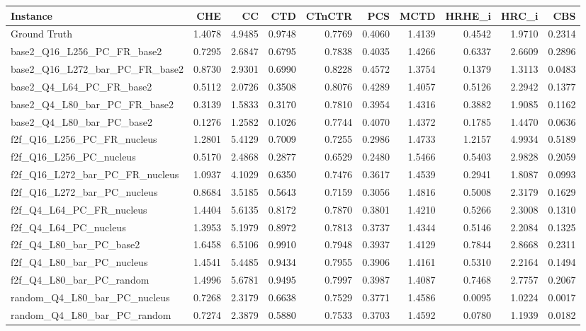\begin{tabular}{lrrrrrrrrr}
\toprule
Instance & CHE & CC & CTD & CTnCTR & PCS & MCTD & HRHE_i & HRC_i & CBS \\
\midrule
Ground Truth & 1.4078 & 4.9485 & 0.9748 & 0.7769 & 0.4060 & 1.4139 & 0.4542 & 1.9710 & 0.2314 \\
base2_Q16_L256_PC_FR_base2 & 0.7295 & 2.6847 & 0.6795 & 0.7838 & 0.4035 & 1.4266 & 0.6337 & 2.6609 & 0.2896 \\
base2_Q16_L272_bar_PC_FR_base2 & 0.8730 & 2.9301 & 0.6990 & 0.8228 & 0.4572 & 1.3754 & 0.1379 & 1.3113 & 0.0483 \\
base2_Q4_L64_PC_FR_base2 & 0.5112 & 2.0726 & 0.3508 & 0.8076 & 0.4289 & 1.4057 & 0.5126 & 2.2942 & 0.1377 \\
base2_Q4_L80_bar_PC_FR_base2 & 0.3139 & 1.5833 & 0.3170 & 0.7810 & 0.3954 & 1.4316 & 0.3882 & 1.9085 & 0.1162 \\
base2_Q4_L80_bar_PC_base2 & 0.1276 & 1.2582 & 0.1026 & 0.7744 & 0.4070 & 1.4372 & 0.1785 & 1.4470 & 0.0636 \\
f2f_Q16_L256_PC_FR_nucleus & 1.2801 & 5.4129 & 0.7009 & 0.7255 & 0.2986 & 1.4733 & 1.2157 & 4.9934 & 0.5189 \\
f2f_Q16_L256_PC_nucleus & 0.5170 & 2.4868 & 0.2877 & 0.6529 & 0.2480 & 1.5466 & 0.5403 & 2.9828 & 0.2059 \\
f2f_Q16_L272_bar_PC_FR_nucleus & 1.0937 & 4.1029 & 0.6350 & 0.7476 & 0.3617 & 1.4539 & 0.2941 & 1.8087 & 0.0993 \\
f2f_Q16_L272_bar_PC_nucleus & 0.8684 & 3.5185 & 0.5643 & 0.7159 & 0.3056 & 1.4816 & 0.5008 & 2.3179 & 0.1629 \\
f2f_Q4_L64_PC_FR_nucleus & 1.4404 & 5.6135 & 0.8172 & 0.7870 & 0.3801 & 1.4210 & 0.5266 & 2.3008 & 0.1310 \\
f2f_Q4_L64_PC_nucleus & 1.3953 & 5.1979 & 0.8972 & 0.7813 & 0.3737 & 1.4344 & 0.5146 & 2.2084 & 0.1325 \\
f2f_Q4_L80_bar_PC_base2 & 1.6458 & 6.5106 & 0.9910 & 0.7948 & 0.3937 & 1.4129 & 0.7844 & 2.8668 & 0.2311 \\
f2f_Q4_L80_bar_PC_nucleus & 1.4541 & 5.4485 & 0.9434 & 0.7955 & 0.3906 & 1.4161 & 0.5310 & 2.2164 & 0.1494 \\
f2f_Q4_L80_bar_PC_random & 1.4996 & 5.6781 & 0.9495 & 0.7997 & 0.3987 & 1.4087 & 0.7468 & 2.7757 & 0.2067 \\
random_Q4_L80_bar_PC_nucleus & 0.7268 & 2.3179 & 0.6638 & 0.7529 & 0.3771 & 1.4586 & 0.0095 & 1.0224 & 0.0017 \\
random_Q4_L80_bar_PC_random & 0.7274 & 2.3879 & 0.5880 & 0.7533 & 0.3703 & 1.4592 & 0.0780 & 1.1939 & 0.0182 \\
\bottomrule
\end{tabular}
